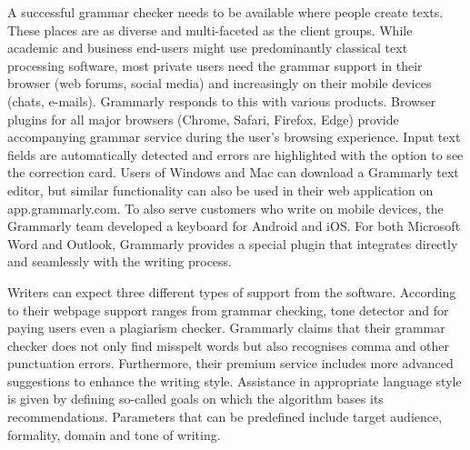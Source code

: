 \documentclass[runningheads]{llncs}
\let\OldTextregistered\textregistered
\renewcommand{\textregistered}{\OldTextregistered\xspace}
\begin{document}
A successful grammar checker needs to be available where people create texts. These places are as diverse and multi-faceted as the client groups. While academic and business end-users might use predominantly classical text processing software, most private users need the grammar support in their browser (web forums, social media) and increasingly on their mobile devices (chats, e-mails). Grammarly\textregistered responds to this with various products. Browser plugins for all major browsers (Chrome, Safari, Firefox, Edge) provide accompanying grammar service during the user's browsing experience. Input text fields are automatically detected and errors are highlighted with the option to see the correction card. Users of Windows and Mac can download a Grammarly\textregistered text editor, but similar functionality can also be used in their web application on app.grammarly.com. To also serve customers who write on mobile devices, the Grammarly\textregistered team developed a keyboard for Android and iOS. For both Microsoft Word and Outlook, Grammarly\textregistered provides a special plugin that integrates directly and seamlessly with the writing process.

Writers can expect three different types of support from the software. According to their webpage \parencite{noauthor_grammarly_nodate} support ranges from grammar checking, tone detector and for paying users even a plagiarism checker. Grammarly\textregistered claims that their grammar checker does not only find misspelt words but also recognises comma and other punctuation errors. Furthermore, their premium service includes more advanced suggestions to enhance the writing style. Assistance in appropriate language style is given by defining so-called goals on which the algorithm bases its recommendations. Parameters that can be predefined include target audience, formality, domain and tone of writing.   
\end{document}
